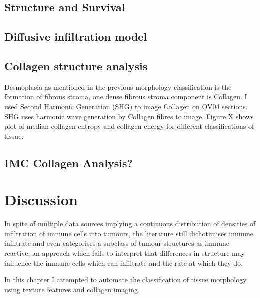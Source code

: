 \subsection{Structure and Survival}

\subsection{Diffusive infiltration model}


\subsection{Collagen structure analysis}
Desmoplasia as mentioned in the previous morphology classification is the formation of fibrous stroma, one dense fibrous stroma component is Collagen. I used Second Harmonic Generation (SHG) to image Collagen on OV04 sections. SHG uses harmonic wave generation by Collagen fibres to image. Figure X shows plot of median collagen entropy and collagen energy for different classifications of tissue.

\subsection{IMC Collagen Analysis?}

\section{Discussion}

In spite of multiple data sources implying a continuous distribution of densities of infiltration of immune cells into tumours, the literature still dichotimises immune infiltrate and even categorises a subclass of tumour structures as immune reactive, an approach which fails to interpret that differences in structure may influence the immune cells which can infiltrate and the rate at which they do.

In this chapter I attempted to automate the classification of tissue morphology using texture features and collagen imaging.



